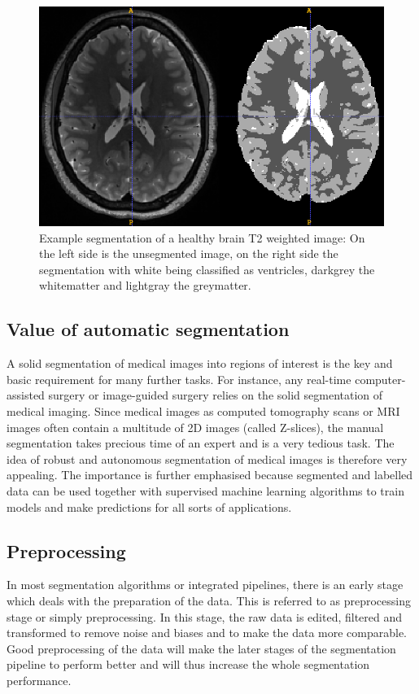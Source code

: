 \documentclass[journal]{IEEEtran}
\begin{document}
\begin{figure}[!t]
\centering
\includegraphics[width=\linewidth]{img/mer}
\caption{Example segmentation of a healthy brain T2 weighted image: On the left side is the unsegmented image, on the right side the segmentation with white being classified as ventricles, darkgrey the whitematter and lightgray the greymatter.}
\label{fig:brainseg}
\end{figure}

\subsection{Value of automatic segmentation}
A solid segmentation of medical images into regions of interest is the key and basic requirement for many further tasks. For instance, any real-time computer-assisted surgery or image-guided surgery relies on the solid segmentation of medical imaging. Since medical images as computed tomography scans or MRI images often contain a multitude of 2D images (called Z-slices), the manual segmentation takes precious time of an expert and is a very tedious task. The idea of robust and autonomous segmentation of medical images is therefore very appealing. The importance is further emphasised because segmented and labelled data can be used together with supervised machine learning algorithms to train models and make predictions for all sorts of applications.


\subsection{Preprocessing}
In most segmentation algorithms or integrated pipelines, there is an early stage which deals with the preparation of the data. This is referred to as preprocessing stage or simply preprocessing. In this stage, the raw data is edited, filtered and transformed to remove noise and biases and to make the data more comparable. Good preprocessing of the data will make the later stages of the segmentation pipeline to perform better and will thus increase the whole segmentation performance.
\end{document}
